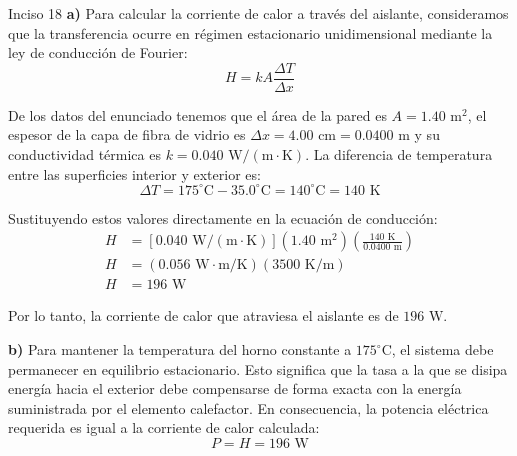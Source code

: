 \documentclass[11pt,letterpaper]{article}
\begin{document}
\begin{inciso}{Inciso 18}
\noindent \textbf{a)} Para calcular la corriente de calor a través del aislante, consideramos que la transferencia ocurre en régimen estacionario unidimensional mediante la ley de conducción de Fourier:
\begin{equation*}
    H = k A \frac{\Delta T}{\Delta x}
\end{equation*}

\noindent De los datos del enunciado tenemos que el área de la pared es $A = 1.40\text{ m}^2$, el espesor de la capa de fibra de vidrio es $\Delta x = 4.00\text{ cm} = 0.0400\text{ m}$ y su conductividad térmica es $k = 0.040\text{ W}/(\text{m}\cdot\text{K})$. La diferencia de temperatura entre las superficies interior y exterior es:
\begin{equation*}
    \Delta T = 175^\circ\text{C} - 35.0^\circ\text{C} = 140^\circ\text{C} = 140\text{ K}
\end{equation*}

\noindent Sustituyendo estos valores directamente en la ecuación de conducción:
\begin{align*}
    H &= [0.040\text{ W}/(\text{m}\cdot\text{K})] (1.40\text{ m}^2) \left( \frac{140\text{ K}}{0.0400\text{ m}} \right) \\
    H &= (0.056\text{ W}\cdot\text{m/K}) (3500\text{ K/m}) \\
    H &= 196\text{ W}
\end{align*}

\noindent Por lo tanto, la corriente de calor que atraviesa el aislante es de $196\text{ W}$.

\vspace{0.8em}
\noindent \textbf{b)} Para mantener la temperatura del horno constante a $175^\circ\text{C}$, el sistema debe permanecer en equilibrio estacionario. Esto significa que la tasa a la que se disipa energía hacia el exterior debe compensarse de forma exacta con la energía suministrada por el elemento calefactor. En consecuencia, la potencia eléctrica requerida es igual a la corriente de calor calculada:
\begin{equation*}
    P = H = 196\text{ W}
\end{equation*}
\end{inciso}
\end{document}
